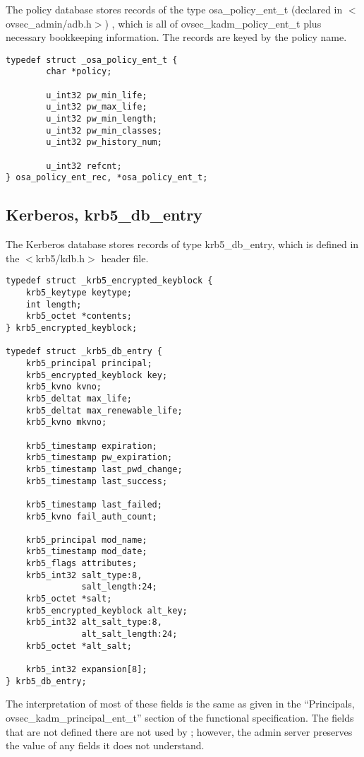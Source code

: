 The policy database stores records of the type osa_policy_ent_t
(declared in $<$ovsec_admin/adb.h$>$) , which is all of
ovsec_kadm_policy_ent_t plus necessary bookkeeping information.  The
records are keyed by the policy name.

\begin{verbatim}
typedef struct _osa_policy_ent_t {
        char *policy;

        u_int32 pw_min_life;
        u_int32 pw_max_life;
        u_int32 pw_min_length;
        u_int32 pw_min_classes;
        u_int32 pw_history_num;

        u_int32 refcnt;
} osa_policy_ent_rec, *osa_policy_ent_t;
\end{verbatim}

\subsection{Kerberos, krb5_db_entry}

The Kerberos database stores records of type krb5_db_entry, which is
defined in the $<$krb5/kdb.h$>$ header file.

\begin{verbatim}
typedef struct _krb5_encrypted_keyblock {
    krb5_keytype keytype;
    int length;
    krb5_octet *contents;
} krb5_encrypted_keyblock;

typedef struct _krb5_db_entry {
    krb5_principal principal;
    krb5_encrypted_keyblock key;
    krb5_kvno kvno;
    krb5_deltat max_life;
    krb5_deltat max_renewable_life;
    krb5_kvno mkvno;
    
    krb5_timestamp expiration;
    krb5_timestamp pw_expiration;
    krb5_timestamp last_pwd_change;
    krb5_timestamp last_success;   
    
    krb5_timestamp last_failed;
    krb5_kvno fail_auth_count;
    
    krb5_principal mod_name;
    krb5_timestamp mod_date;
    krb5_flags attributes;
    krb5_int32 salt_type:8,
               salt_length:24;
    krb5_octet *salt;
    krb5_encrypted_keyblock alt_key;
    krb5_int32 alt_salt_type:8,
               alt_salt_length:24;
    krb5_octet *alt_salt;
    
    krb5_int32 expansion[8];
} krb5_db_entry;
\end{verbatim}

The interpretation of most of these fields is the same as given in the
``Principals, ovsec_kadm_principal_ent_t'' section of the functional
specification.  The fields that are not defined there are not used by
\secure{}; however, the admin server preserves the value of any fields
it does not understand.

